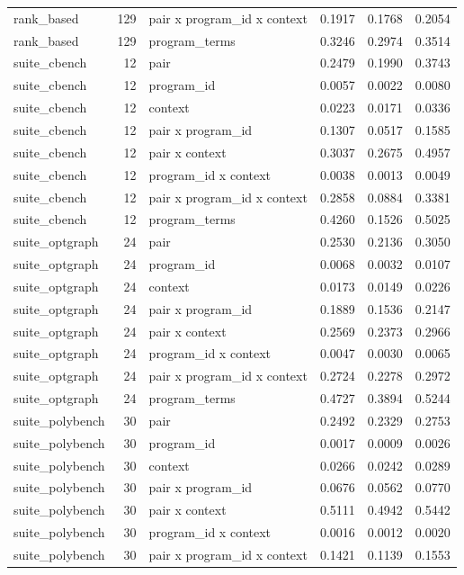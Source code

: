 \begin{table}[t]
\begin{tabular}{lrlrrr}
rank\_based & 129 & pair x program\_id x context & 0.1917 & 0.1768 & 0.2054 \\
rank\_based & 129 & program\_terms & 0.3246 & 0.2974 & 0.3514 \\
suite\_cbench & 12 & pair & 0.2479 & 0.1990 & 0.3743 \\
suite\_cbench & 12 & program\_id & 0.0057 & 0.0022 & 0.0080 \\
suite\_cbench & 12 & context & 0.0223 & 0.0171 & 0.0336 \\
suite\_cbench & 12 & pair x program\_id & 0.1307 & 0.0517 & 0.1585 \\
suite\_cbench & 12 & pair x context & 0.3037 & 0.2675 & 0.4957 \\
suite\_cbench & 12 & program\_id x context & 0.0038 & 0.0013 & 0.0049 \\
suite\_cbench & 12 & pair x program\_id x context & 0.2858 & 0.0884 & 0.3381 \\
suite\_cbench & 12 & program\_terms & 0.4260 & 0.1526 & 0.5025 \\
suite\_optgraph & 24 & pair & 0.2530 & 0.2136 & 0.3050 \\
suite\_optgraph & 24 & program\_id & 0.0068 & 0.0032 & 0.0107 \\
suite\_optgraph & 24 & context & 0.0173 & 0.0149 & 0.0226 \\
suite\_optgraph & 24 & pair x program\_id & 0.1889 & 0.1536 & 0.2147 \\
suite\_optgraph & 24 & pair x context & 0.2569 & 0.2373 & 0.2966 \\
suite\_optgraph & 24 & program\_id x context & 0.0047 & 0.0030 & 0.0065 \\
suite\_optgraph & 24 & pair x program\_id x context & 0.2724 & 0.2278 & 0.2972 \\
suite\_optgraph & 24 & program\_terms & 0.4727 & 0.3894 & 0.5244 \\
suite\_polybench & 30 & pair & 0.2492 & 0.2329 & 0.2753 \\
suite\_polybench & 30 & program\_id & 0.0017 & 0.0009 & 0.0026 \\
suite\_polybench & 30 & context & 0.0266 & 0.0242 & 0.0289 \\
suite\_polybench & 30 & pair x program\_id & 0.0676 & 0.0562 & 0.0770 \\
suite\_polybench & 30 & pair x context & 0.5111 & 0.4942 & 0.5442 \\
suite\_polybench & 30 & program\_id x context & 0.0016 & 0.0012 & 0.0020 \\
suite\_polybench & 30 & pair x program\_id x context & 0.1421 & 0.1139 & 0.1553 \\

\end{tabular}
\end{table}
